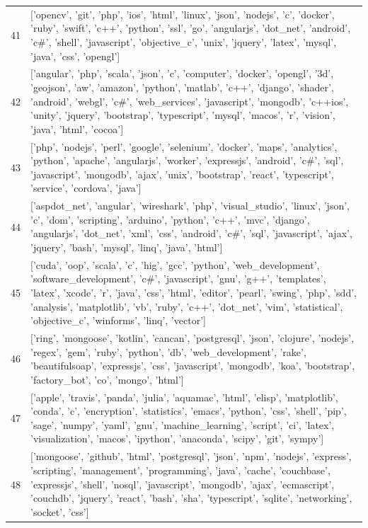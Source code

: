 \begin{center}
\begin{longtable}{|p{1.5cm}|p{12.5cm}|}
            41 & ['opencv', 'git', 'php', 'ios', 'html', 'linux', 'json', 'nodejs', 'c', 'docker', 'ruby', 'swift', 'c++', 'python', 'ssl', 'go', 'angularjs', 'dot\_net', 'android', 'c\#', 'shell', 'javascript', 'objective\_c', 'unix', 'jquery', 'latex', 'mysql', 'java', 'css', 'opengl']  \\ 
            42 & ['angular', 'php', 'scala', 'json', 'c', 'computer', 'docker', 'opengl', '3d', 'geojson', 'aw', 'amazon', 'python', 'matlab', 'c++', 'django', 'shader', 'android', 'webgl', 'c\#', 'web\_services', 'javascript', 'mongodb', 'c++ios', 'unity', 'jquery', 'bootstrap', 'typescript', 'mysql', 'macos', 'r', 'vision', 'java', 'html', 'cocoa']  \\ 
            43 & ['php', 'nodejs', 'perl', 'google', 'selenium', 'docker', 'maps', 'analytics', 'python', 'apache', 'angularjs', 'worker', 'expressjs', 'android', 'c\#', 'sql', 'javascript', 'mongodb', 'ajax', 'unix', 'bootstrap', 'react', 'typescript', 'service', 'cordova', 'java']  \\ 
            44 & ['aspdot\_net', 'angular', 'wireshark', 'php', 'visual\_studio', 'linux', 'json', 'c', 'dom', 'scripting', 'arduino', 'python', 'c++', 'mvc', 'django', 'angularjs', 'dot\_net', 'xml', 'css', 'android', 'c\#', 'sql', 'javascript', 'ajax', 'jquery', 'bash', 'mysql', 'linq', 'java', 'html']  \\ 
            45 & ['cuda', 'oop', 'scala', 'c', 'hig', 'gcc', 'python', 'web\_development', 'software\_development', 'c\#', 'javascript', 'gnu', 'g++', 'templates', 'latex', 'xcode', 'r', 'java', 'css', 'html', 'editor', 'pearl', 'swing', 'php', 'sdd', 'analysis', 'matplotlib', 'vb', 'ruby', 'c++', 'dot\_net', 'vim', 'statistical', 'objective\_c', 'winforms', 'linq', 'vector']  \\ 
            46 & ['ring', 'mongoose', 'kotlin', 'cancan', 'postgresql', 'json', 'clojure', 'nodejs', 'regex', 'gem', 'ruby', 'python', 'db', 'web\_development', 'rake', 'beautifulsoap', 'expressjs', 'css', 'javascript', 'mongodb', 'koa', 'bootstrap', 'factory\_bot', 'co', 'mongo', 'html']  \\ 
            47 & ['apple', 'travis', 'panda', 'julia', 'aquamac', 'html', 'elisp', 'matplotlib', 'conda', 'c', 'encryption', 'statistics', 'emacs', 'python', 'css', 'shell', 'pip', 'sage', 'numpy', 'yaml', 'gnu', 'machine\_learning', 'script', 'ci', 'latex', 'visualization', 'macos', 'ipython', 'anaconda', 'scipy', 'git', 'sympy']  \\ 
            48 & ['mongoose', 'github', 'html', 'postgresql', 'json', 'npm', 'nodejs', 'express', 'scripting', 'management', 'programming', 'java', 'cache', 'couchbase', 'expressjs', 'shell', 'nosql', 'javascript', 'mongodb', 'ajax', 'ecmascript', 'couchdb', 'jquery', 'react', 'bash', 'sha', 'typescript', 'sqlite', 'networking', 'socket', 'css']  \\ 

\end{longtable}
\end{center}
